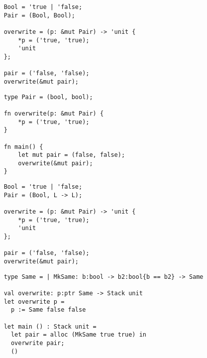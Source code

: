 \documentclass[12pt,twoside]{report}
\begin{document}



\clearpage{\pagestyle{empty}\cleardoublepage}
\setcounter{page}{1}
\pagestyle{fancy}


\begin{verbatim}
    Bool = 'true | 'false;
    Pair = (Bool, Bool);

    overwrite = (p: &mut Pair) -> 'unit {
        *p = ('true, 'true);
        'unit
    };

    pair = ('false, 'false);          
    overwrite(&mut pair);
\end{verbatim}

\begin{verbatim}
    type Pair = (bool, bool);

    fn overwrite(p: &mut Pair) {
        *p = ('true, 'true);
    }

    fn main() {
        let mut pair = (false, false);
        overwrite(&mut pair);
    }
\end{verbatim}

\begin{verbatim}
    Bool = 'true | 'false;
    Pair = (Bool, L -> L);

    overwrite = (p: &mut Pair) -> 'unit {
        *p = ('true, 'true);
        'unit
    };

    pair = ('false, 'false);          
    overwrite(&mut pair);
\end{verbatim}

\begin{verbatim}
    type Same = | MkSame: b:bool -> b2:bool{b == b2} -> Same

    val overwrite: p:ptr Same -> Stack unit
    let overwrite p =
      p := Same false false
      
    let main () : Stack unit =
      let pair = alloc (MkSame true true) in
      overwrite pair;
      ()
\end{verbatim}
\end{document}
